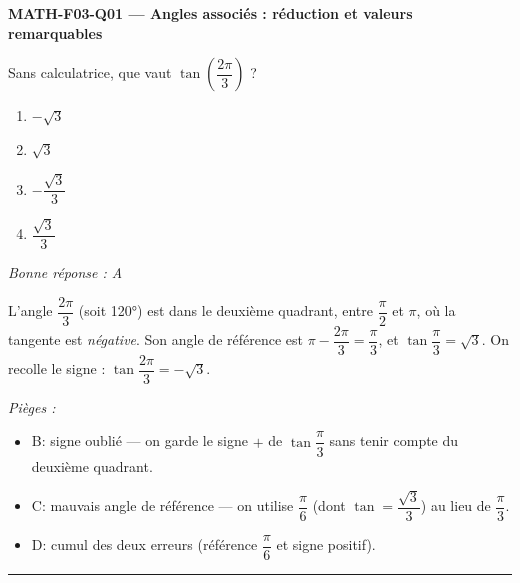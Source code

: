 \documentclass[11pt,a4paper]{article}
\begin{document}
\noindent\textbf{MATH-F03-Q01 --- Angles associés : réduction et valeurs remarquables}\par
Sans calculatrice, que vaut $\tan\!\left(\dfrac{2\pi}{3}\right)$ ?
\begin{enumerate}[label=\Alph*)]
\item $-\sqrt{3}$
\item $\sqrt{3}$
\item $-\dfrac{\sqrt{3}}{3}$
\item $\dfrac{\sqrt{3}}{3}$
\end{enumerate}
\textit{Bonne réponse : A}\par
L'angle $\dfrac{2\pi}{3}$ (soit \ang{120}) est dans le deuxième quadrant, entre $\dfrac{\pi}{2}$ et $\pi$, où la tangente est \emph{négative}. Son angle de référence est $\pi-\dfrac{2\pi}{3}=\dfrac{\pi}{3}$, et $\tan\dfrac{\pi}{3}=\sqrt{3}$. On recolle le signe : $\tan\dfrac{2\pi}{3}=-\sqrt{3}$.\par
\textit{Pièges :}
\begin{itemize}
\item B: signe oublié --- on garde le signe $+$ de $\tan\dfrac{\pi}{3}$ sans tenir compte du deuxième quadrant.
\item C: mauvais angle de référence --- on utilise $\dfrac{\pi}{6}$ (dont $\tan=\dfrac{\sqrt3}{3}$) au lieu de $\dfrac{\pi}{3}$.
\item D: cumul des deux erreurs (référence $\dfrac{\pi}{6}$ et signe positif).
\end{itemize}
\vspace{8pt}\hrule\vspace{8pt}
\end{document}

